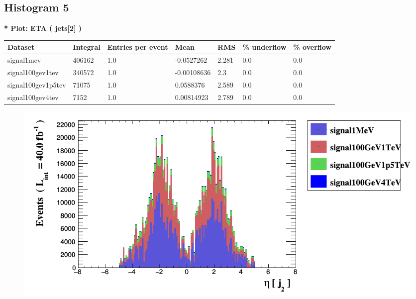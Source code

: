 \documentclass[a4paper, 10pt]{article}
\begin{document}
\subsection{ Histogram 5}

\textbf{* Plot: ETA ( jets[2] ) }\\
   \begin{table}[H]
  \begin{center}
    \begin{tabular}{|m{23.0mm}|m{23.0mm}|m{18.0mm}|m{19.0mm}|m{19.0mm}|m{19.0mm}|m{19.0mm}|}
      \hline
      {\cellcolor{yellow}         Dataset}& {\cellcolor{yellow}         Integral}& {\cellcolor{yellow}         Entries per event}& {\cellcolor{yellow}         Mean}& {\cellcolor{yellow}         RMS}& {\cellcolor{yellow}         \% underflow}& {\cellcolor{yellow}         \% overflow}\\
      \hline
      {\cellcolor{white}         signal1mev}& {\cellcolor{white}         406162}& {\cellcolor{white}         1.0}& {\cellcolor{white}         -0.0527262}& {\cellcolor{white}         2.281}& {\cellcolor{green}         0.0}& {\cellcolor{green}         0.0}\\
      \hline
      {\cellcolor{white}         signal100gev1tev}& {\cellcolor{white}         340572}& {\cellcolor{white}         1.0}& {\cellcolor{white}         -0.00108636}& {\cellcolor{white}         2.3}& {\cellcolor{green}         0.0}& {\cellcolor{green}         0.0}\\
      \hline
      {\cellcolor{white}         signal100gev1p5tev}& {\cellcolor{white}         71075}& {\cellcolor{white}         1.0}& {\cellcolor{white}         0.0588376}& {\cellcolor{white}         2.589}& {\cellcolor{green}         0.0}& {\cellcolor{green}         0.0}\\
      \hline
      {\cellcolor{white}         signal100gev4tev}& {\cellcolor{white}         7152}& {\cellcolor{white}         1.0}& {\cellcolor{white}         0.00814923}& {\cellcolor{white}         2.789}& {\cellcolor{green}         0.0}& {\cellcolor{green}         0.0}\\
\hline
    \end{tabular}
  \end{center}
\end{table}

\begin{figure}[H]
  \begin{center}
    \includegraphics[scale=0.45]{selection_4.png}\\
\caption{   }
  \end{center}
\end{figure}
      \newpage
\end{document}
